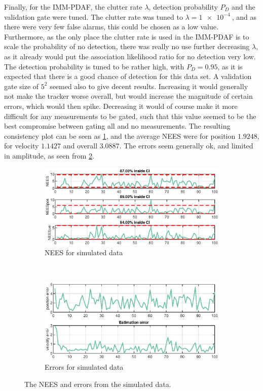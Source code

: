 Finally, for the IMM-PDAF, the clutter rate $\lambda$, detection probability $P_D$ and the validation gate were tuned. The clutter rate was tuned to $\lambda = \SI{1e-4}{}$, and as there were very few false alarms, this could be chosen as a low value. Furthermore, as the only place the clutter rate is used in the IMM-PDAF is to scale the probability of no detection, there was really no use further decreasing $\lambda$, as it already would put the association likelihood ratio for no detection very low. The detection probability is tuned to be rather high, with $P_D = 0.95$, as it is expected that there is a good chance of detection for this data set. A validation gate size of $5^2$ seemed also to give decent results. Increasing it would generally not make the tracker worse overall, but would increase the magnitude of certain errors, which would then spike. Decreasing it would of course make it more difficult for any measurements to be gated, such that this value seemed to be the best compromise between gating all and no measurements. The resulting consistency plot can be seen as \cref{fig:ga_1_2_NEES}, and the average NEES were for position $1.9248$, for velocity $1.1427$ and overall $3.0887$. The errors seem generally ok, and limited in amplitude, as seen from \cref{fig:ga_1_2_error}. 

\begin{figure}[ht]
	\begin{subfigure}[h]{0.4\textwidth}
		\includegraphics[width=\textwidth]{figures/ga_1/2_NEES}
		\caption{NEES for simulated data}
		\label{fig:ga_1_2_NEES}
    \end{subfigure}%
    ~
    \begin{subfigure}[h]{0.4\textwidth}
        \includegraphics[width=\textwidth]{figures/ga_1/2_error}
        \caption{Errors for simulated data}
        \label{fig:ga_1_2_error}
    \end{subfigure}
    \caption{The NEES and errors from the simulated data. }
    \label{fig:ga_1_2_NEES_and_error} 
\end{figure}

